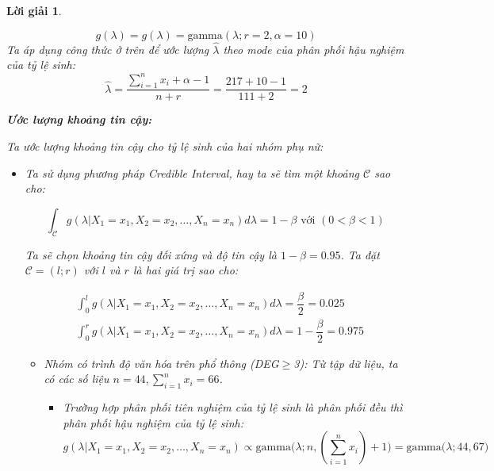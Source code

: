 \documentclass[14pt, a4paper]{article}
\theoremstyle{sltheorem}
\theoremstyle{soltheorem}
\newtheorem*{loigiai}{Lời giải}
\begin{document}
\begin{loigiai}
\begin{enumerate}
\begin{itemize}
\begin{itemize}
\begin{equation*}
                    g(\lambda) = g(\lambda) = \text{gamma}(\lambda; r=2, \alpha=10)
                \end{equation*}
                Ta áp dụng công thức ở trên để ước lượng $\hat{\lambda}$ theo mode của phân phối hậu nghiệm của tỷ lệ sinh:
                \begin{equation*}
                    \hat{\lambda} = \dfrac{\sum_{i=1}^n x_i + \alpha - 1}{n + r} = \dfrac{217+10-1}{111 + 2}=2
                \end{equation*}
            \end{itemize}
        \end{itemize}

        \textbf{Ước lượng khoảng tin cậy:}

        Ta ước lượng khoảng tin cậy cho tỷ lệ sinh của hai nhóm phụ nữ:

        \begin{itemize}
            \item Ta sử dụng phương pháp Credible Interval, hay ta sẽ tìm một khoảng $\mathcal{C}$ sao cho:

        \begin{equation*}
            \int_{\mathcal{C}} g(\lambda \vert X_1 =x_1, X_2=x_2, \dots, X_n=x_n) d\lambda = 1 - \beta \text{ với } (0 < \beta < 1)
        \end{equation*}

        Ta sẽ chọn khoảng tin cậy đối xứng và độ tin cậy là $1-\beta=0.95$.
        Ta đặt $\mathcal{C}=(l;r)$ với $l$ và $r$ là hai giá trị sao cho:

        \begin{equation*}
            \begin{aligned}
                &\int_{0}^l g(\lambda \vert X_1 =x_1, X_2=x_2, \dots, X_n=x_n) d\lambda = \dfrac{\beta}{2}=0.025 \\
                &\int_{0}^r g(\lambda \vert X_1 =x_1, X_2=x_2, \dots, X_n=x_n) d\lambda = 1-\dfrac{\beta}{2}=0.975
            \end{aligned}
        \end{equation*}

        \begin{itemize}
            \item Nhóm có trình độ văn hóa trên phổ thông (DEG$\geq$3):
            Từ tập dữ liệu, ta có các số liệu $n=44, \sum_{i=1}^n x_i=66$.
            \begin{itemize}
                \item Trường hợp phân phối tiên nghiệm của tỷ lệ sinh là phân phối đều thì phân phối hậu nghiệm của tỷ lệ sinh:
                \begin{equation*}
                    g(\lambda \vert X_1 =x_1, X_2=x_2, \dots, X_n=x_n) \propto \text{gamma}\big(\lambda; n, (\sum_{i=1}^n x_i) + 1\big) = \text{gamma}\big(\lambda; 44, 67\big)
                \end{equation*}


\end{itemize}
\end{itemize}
\end{itemize}
\end{enumerate}
\end{loigiai}
\end{document}

